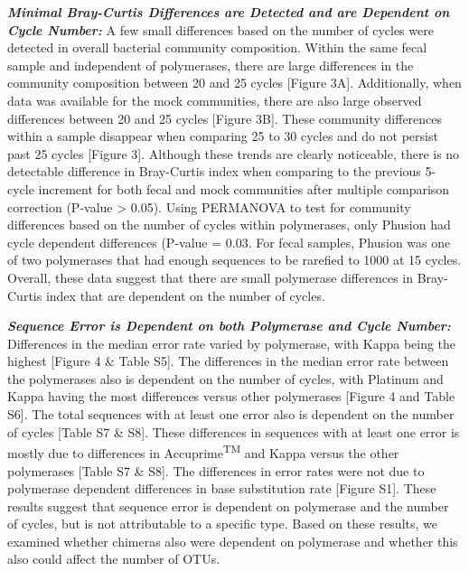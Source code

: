 \documentclass[12pt,]{article}
\begin{document}
\textbf{\emph{Minimal Bray-Curtis Differences are Detected and are
Dependent on Cycle Number:}} A few small differences based on the number
of cycles were detected in overall bacterial community composition.
Within the same fecal sample and independent of polymerases, there are
large differences in the community composition between 20 and 25 cycles
{[}Figure 3A{]}. Additionally, when data was available for the mock
communities, there are also large observed differences between 20 and 25
cycles {[}Figure 3B{]}. These community differences within a sample
disappear when comparing 25 to 30 cycles and do not persist past 25
cycles {[}Figure 3{]}. Although these trends are clearly noticeable,
there is no detectable difference in Bray-Curtis index when comparing to
the previous 5-cycle increment for both fecal and mock communities after
multiple comparison correction (P-value \textgreater{} 0.05). Using
PERMANOVA to test for community differences based on the number of
cycles within polymerases, only Phusion had cycle dependent differences
(P-value = 0.03. For fecal samples, Phusion was one of two polymerases
that had enough sequences to be rarefied to 1000 at 15 cycles. Overall,
these data suggest that there are small polymerase differences in
Bray-Curtis index that are dependent on the number of cycles.

\textbf{\emph{Sequence Error is Dependent on both Polymerase and Cycle
Number:}} Differences in the median error rate varied by polymerase,
with Kappa being the highest {[}Figure 4 \& Table S5{]}. The differences
in the median error rate between the polymerases also is dependent on
the number of cycles, with Platinum and Kappa having the most
differences versus other polymerases {[}Figure 4 and Table S6{]}. The
total sequences with at least one error also is dependent on the number
of cycles {[}Table S7 \& S8{]}. These differences in sequences with at
least one error is mostly due to differences in
Accuprime\textsuperscript{TM} and Kappa versus the other polymerases
{[}Table S7 \& S8{]}. The differences in error rates were not due to
polymerase dependent differences in base substitution rate {[}Figure
S1{]}. These results suggest that sequence error is dependent on
polymerase and the number of cycles, but is not attributable to a
specific type. Based on these results, we examined whether chimeras also
were dependent on polymerase and whether this also could affect the
number of OTUs.
\end{document}
